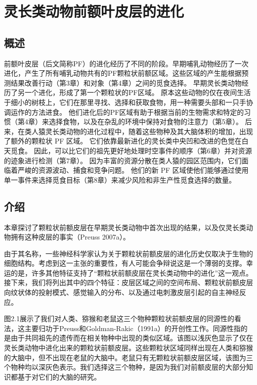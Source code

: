 \chapter{灵长类动物前额叶皮层的进化}

\section{概述}
前额叶皮层（后文简称PF）的进化经历了不同的阶段。早期哺乳动物经历了一次进化，产生了所有哺乳动物共有的PF颗粒状前额区域。这些区域的产生能根据预测结果改善行动（第3章）和对象（第4章）之间的觅食选择。
早期灵长类动物经历了另一个进化，形成了第一个颗粒状的PF区域。
原本这些动物的仅在夜间生活于细小的树枝上，它们在那里寻找、选择和获取食物，用一种需要头部和一只手协调运作的方法进食。
他们进化后的PF区域有助于根据当前的生物需求和特定的习惯（第4章）来选择食物，以及在杂乱的环境中保持对食物的注意力（第5章）。
后来，在类人猿灵长类动物的进化过程中，随着这些物种及其大脑体积的增加，出现了额外的颗粒状 PF 区域。
它们依靠最新进化的灵长类中央凹和改进的色觉在白天觅食。 因此，可以比它们的祖先更好地处理时空事件的顺序（第6章）并对资源的迹象进行检测（第7章）。
因为丰富的资源分散在类人猿的园区范围内，它们面临着严峻的资源波动、捕食和竞争问题。
他们的新 PF 区域使他们能够通过使用单一事件来选择觅食目标（第8章）来减少风险和非生产性觅食选择的数量。

\section{介绍}
本章探讨了颗粒状前额皮层在早期灵长类动物中首次出现的结果，以及仅灵长类动物拥有这种皮层的事实（Preuss 2007a）。

由于其名称，一些神经科学家认为关于颗粒状前额皮层的进化历史仅取决于生物的细胞结构。考虑到这一主张的重要性，有人可能会争辩说这是一个薄弱的支撑。幸运的是，许多其他特征支持了“颗粒状前额皮层在灵长类动物中的进化”这一观点。接下来，我们将列出其中的四个特征：皮层区域之间的空间布局、颗粒状前额皮层向纹状体的投射模式、感觉输入的分布、以及通过电刺激皮层引起的自主神经反应。

图2.1展示了我们对人类、猕猴和老鼠这三个物种颗粒状前额皮层的同源性的看法，这主要归功于Preuss和Goldman-Rakic（1991a）的开创性工作。同源性指的是由于共同祖先的遗传而在相关物种中出现的类似区域。该图以浅灰色显示了仅在灵长类动物中进化出来的颗粒状前额皮层。这些颗粒状区域同样出现在人类和猕猴的大脑中，但不出现在老鼠的大脑中。老鼠只有无颗粒状前额皮层区域，该图为三个物种均以深灰色表示。我们选择这三个物种，是因为我们对前额皮层的大部分知识都基于对它们的大脑的研究。

